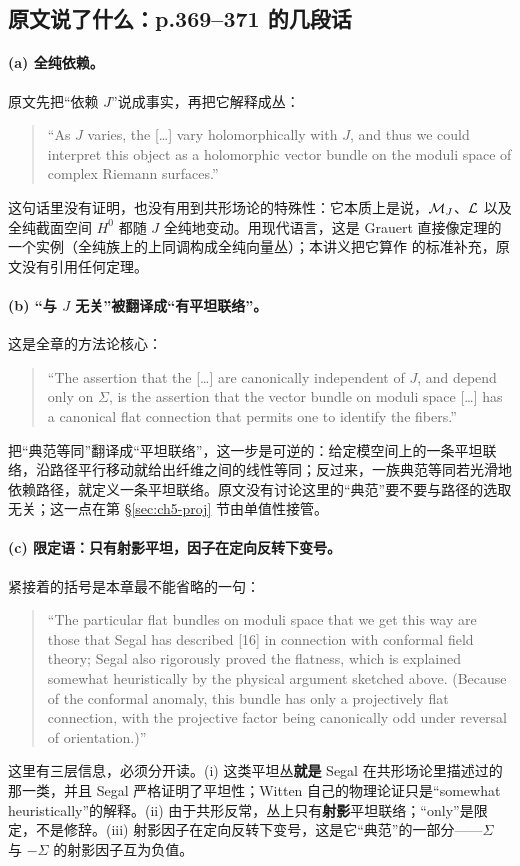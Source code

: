 \subsection{原文说了什么：p.369--371 的几段话}
\label{sec:ch5-quotes}

\paragraph{(a) 全纯依赖。}原文先把“依赖 $J$”说成事实，再把它解释成丛：
\begin{quote}\small
“As $J$ varies, the [\dots] vary holomorphically with $J$, and thus we could interpret this object as a holomorphic vector bundle on the moduli space of complex Riemann surfaces.” 
\end{quote}
这句话里没有证明，也没有用到共形场论的特殊性：它本质上是说，$\mathcal{M}_J$、$\mathcal{L}$ 以及全纯截面空间 $H^0$ 都随 $J$ 全纯地变动。用现代语言，这是 Grauert 直接像定理的一个实例（全纯族上的上同调构成全纯向量丛）；本讲义把它算作 \ours{} 的标准补充，原文没有引用任何定理。

\paragraph{(b) “与 $J$ 无关”被翻译成“有平坦联络”。}这是全章的方法论核心：
\begin{quote}\small
“The assertion that the [\dots] are canonically independent of $J$, and depend only on $\Sigma$, is the assertion that the vector bundle on moduli space [\dots] has a canonical flat connection that permits one to identify the fibers.” 
\end{quote}
把“典范等同”翻译成“平坦联络”，这一步是可逆的：给定模空间上的一条平坦联络，沿路径平行移动就给出纤维之间的线性等同；反过来，一族典范等同若光滑地依赖路径，就定义一条平坦联络。原文没有讨论这里的“典范”要不要与路径的选取无关；这一点在第 \S\ref{sec:ch5-proj} 节由单值性接管。

\paragraph{(c) 限定语：只有射影平坦，因子在定向反转下变号。}紧接着的括号是本章最不能省略的一句：
\begin{quote}\small
“The particular flat bundles on moduli space that we get this way are those that Segal has described [16] in connection with conformal field theory; Segal also rigorously proved the flatness, which is explained somewhat heuristically by the physical argument sketched above. (Because of the conformal anomaly, this bundle has only a projectively flat connection, with the projective factor being canonically odd under reversal of orientation.)” 
\end{quote}
这里有三层信息，必须分开读。(i) 这类平坦丛\textbf{就是} Segal 在共形场论里描述过的那一类，并且 Segal 严格证明了平坦性；Witten 自己的物理论证只是“somewhat heuristically”的解释。(ii) 由于共形反常，丛上只有\textbf{射影}平坦联络；“only”是限定，不是修辞。(iii) 射影因子在定向反转下变号，这是它“典范”的一部分——$\Sigma$ 与 $-\Sigma$ 的射影因子互为负值。

